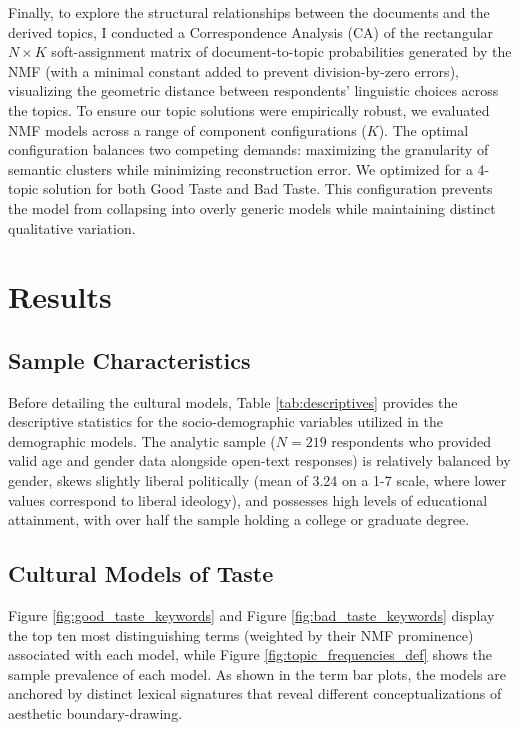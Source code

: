 \documentclass[12pt,letterpaper]{article}
\begin{document}
Finally, to explore the structural relationships between the documents and the derived topics, I conducted a Correspondence Analysis (CA) of the rectangular $N \times K$ soft-assignment matrix of document-to-topic probabilities generated by the NMF (with a minimal constant added to prevent division-by-zero errors), visualizing the geometric distance between respondents' linguistic choices across the topics. To ensure our topic solutions were empirically robust, we evaluated NMF models across a range of component configurations ($K$). The optimal configuration balances two competing demands: maximizing the granularity of semantic clusters while minimizing reconstruction error. We optimized for a 4-topic solution for both Good Taste and Bad Taste. This configuration prevents the model from collapsing into overly generic models while maintaining distinct qualitative variation.

\section{Results}

\subsection{Sample Characteristics}
Before detailing the cultural models, Table \ref{tab:descriptives} provides the descriptive statistics for the socio-demographic variables utilized in the demographic models. The analytic sample ($N = 219$ respondents who provided valid age and gender data alongside open-text responses) is relatively balanced by gender, skews slightly liberal politically (mean of 3.24 on a 1-7 scale, where lower values correspond to liberal ideology), and possesses high levels of educational attainment, with over half the sample holding a college or graduate degree.



\subsection{Cultural Models of Taste}

Figure \ref{fig:good_taste_keywords} and Figure \ref{fig:bad_taste_keywords} display the top ten most distinguishing terms (weighted by their NMF prominence) associated with each model, while Figure \ref{fig:topic_frequencies_def} shows the sample prevalence of each model. As shown in the term bar plots, the models are anchored by distinct lexical signatures that reveal different conceptualizations of aesthetic boundary-drawing. 
\end{document}
